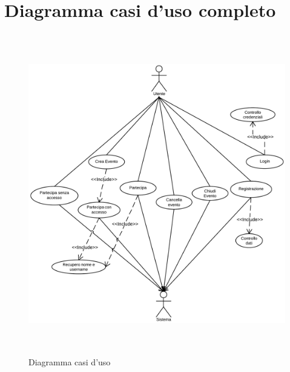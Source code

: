 \section{Diagramma casi d'uso completo}
\begin{figure}[H]
\centering
\includegraphics[width=16cm, height=14cm]{img/use/Diagusocompleto.png}
\caption{Diagramma casi d'uso}
\label{fig:diagcompl}
\end{figure}



